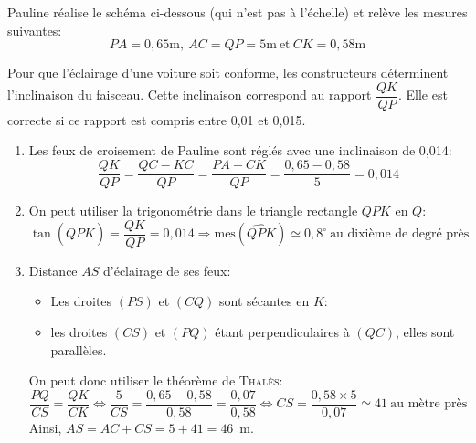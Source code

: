 
Pauline réalise le schéma ci-dessous (qui n'est pas à l'échelle) et relève les mesures suivantes:
\[
PA=0,65\text{m},\ AC=QP=5\text{m}\ \text{et}\ CK=0,58\text{m}
\]
\begin{center}
\end{center}
Pour que l'éclairage d'une voiture soit conforme, les constructeurs déterminent l'inclinaison du faisceau. Cette inclinaison correspond au rapport $\dfrac{QK}{QP}$. Elle est correcte si ce rapport est compris entre 0,01 et 0,015.
\begin{enumerate}
\item Les feux de croisement de Pauline sont réglés avec une inclinaison de 0,014:
\[
\frac{QK}{QP}=\frac{QC-KC}{QP}=\frac{PA-CK}{QP}=\frac{0,65-0,58}{5}=0,014
\]
\item On peut utiliser la trigonométrie dans le triangle rectangle $QPK$ en $Q$:
\[
\tan(\widehat{QPK})=\frac{QK}{QP}=0,014\Longrightarrow \text{mes}(\widehat{QPK})\simeq 0,8^{\circ}\ \text{au dixième de degré près}
\]
\item Distance $AS$ d'éclairage de ses feux:

\begin{itemize}
\item Les droites $(PS)$ et $(CQ)$ sont sécantes en $K$:
\item les droites $(CS)$ et $(PQ)$ étant perpendiculaires à $(QC)$, elles sont parallèles.
\end{itemize}
On peut donc utiliser le théorème de \textsc{Thalès}:
\[
\frac{PQ}{CS}=\frac{QK}{CK}\Longleftrightarrow \frac{5}{CS}=\frac{0,65-0,58}{0,58}=\frac{0,07}{0,58}\Longleftrightarrow CS=\frac{0,58\times 5}{0,07}\simeq 41\ \text{au mètre près}
\]
Ainsi, $AS=AC+CS=5+41=46$~m.
\end{enumerate}
